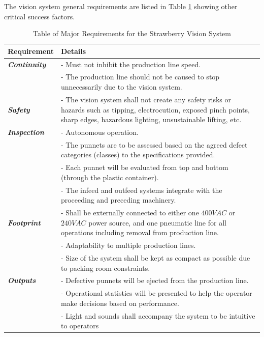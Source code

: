 \documentclass[fleqn,twoside,12pt]{report}
\begin{document}
The vision system general requirements are listed in Table \ref{tab:requirements} showing other critical success factors.



\renewcommand{\arraystretch}{0.8}%
\begin{longtable}{p{2.5cm}p{12cm}}
	\caption{Table of Major Requirements for the Strawberry Vision System}
	\label{tab:requirements} \\
	
	\hline\hline
	\textbf{Requirement} & \textbf{Details} \\[2pt]
	\hline \hline
	\textbf{\textit{Continuity}} 	& - Must not inhibit the production line speed. \\[2pt]
	& - The production line should not be caused to stop unnecessarily due to the vision system.\\[2pt]
	\hline
	\textbf{\textit{Safety}}    & - The vision system shall not create any safety risks or hazards such as tipping, electrocution, exposed pinch points, sharp edges, hazardous lighting, unsustainable lifting, etc.  \\[2pt]
	\hline
	\textbf{\textit{Inspection}} 	& - Autonomous operation.\\[2pt]
	& - The punnets are to be assessed based on the agreed defect categories (classes) to the specifications provided. \\[2pt]
	& - Each punnet will be evaluated from top and bottom (through the plastic container). \\[2pt]
	& - The infeed and outfeed systems integrate with the proceeding and preceding machinery. \\[2pt]
	\hline
	\textbf{\textit{Footprint}}	& - Shall be externally connected to either one $400VAC$ or $240VAC$ power source, and one pneumatic line for all operations including removal from production line.  \\[2pt]
	& - Adaptability to multiple production lines. \\[2pt]
	& - Size of the system shall be kept as compact as possible due to packing room constraints. \\[2pt]
	\hline
	\textbf{\textit{Outputs}}	& - Defective punnets will be ejected from the production line.  \\[2pt]
	& - Operational statistics will be presented to help the operator make decisions based on performance.  \\[2pt]
	& - Light and sounds shall accompany the system to be intuitive to operators \\[2pt]

\end{longtable}
\end{document}

